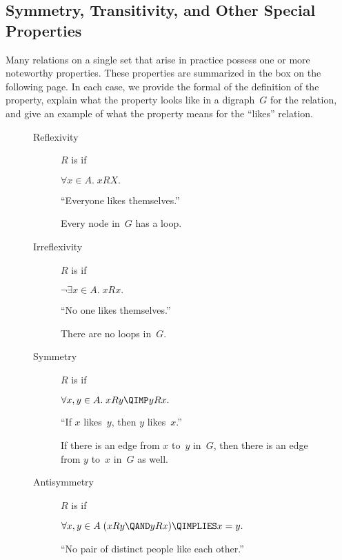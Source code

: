 \subsection{Symmetry, Transitivity, and Other Special Properties}

Many relations on a single set that arise in practice possess one or
more noteworthy properties.  These properties are summarized in the
box on the following page.  In each case, we provide the formal of the
definition of the property, explain what the property looks like in a
digraph~$G$ for the relation, and give an example of what the property
means for the ``likes'' relation.

\begin{figure}[p]\redrawntrue

\begin{pagesidebar}[to \textheight]

\begin{description}

\item[Reflexivity]

$R$ is  if

$\forall x \in A. \; x R X.$

``Everyone likes themselves.''

Every node in~$G$ has a loop.

\item[Irreflexivity]

$R$ is  if

$ \neg \exists x \in A. \; x R x.$

``No one likes themselves.''

There are no loops in~$G$.

\item[Symmetry]

$R$ is  if

$ \forall x, y \in A. \; x R y \QIMP y R x.$

``If $x$ likes~$y$, then $y$ likes~$x$.''

If there is an edge from $x$ to~$y$ in~$G$, then there is an edge from
$y$ to~$x$ in~$G$ as well.

\item[Antisymmetry]

$R$ is  if

$ \forall x, y \in A\; (x R y \QAND y R x) \QIMPLIES x = y.$

``No pair of distinct people like each other.''


\end{description}
\end{pagesidebar}
\end{figure}
